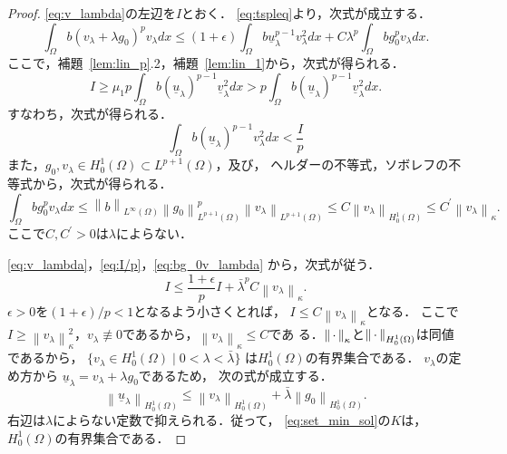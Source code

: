 \begin{proof}
 \eqref{eq:v_lambda}の左辺を$I$とおく．
 \eqref{eq:tspleq}より，次式が成立する．
 \begin{equation}
  \int_\Omega b (v_\lambda + \lambda g_0)^p v_\lambda dx 
   \leq (1 + \epsilon) \int_\Omega b \underline{u}_\lambda ^{p-1}
   v_\lambda^2 dx + C \lambda^p \int_\Omega bg_0^p v_\lambda dx.
   \label{eq:v_lambda_I}
 \end{equation}
 ここで，補題~\ref{lem:lin_p}.2，補題~\ref{lem:lin_1}から，次式が得られる．
 \[
  I \geq \mu_1 p \int_\Omega b (\underline{u}_\lambda)^{p-1}
 \underline{v}_\lambda^2 dx > p \int_\Omega b (\underline{u}_\lambda)^{p-1}
 \underline{v}_\lambda^2 dx.
 \]
 すなわち，次式が得られる．
 \begin{equation}
  \int_\Omega b(\underline{u}_\lambda)^{p-1} v_\lambda^2 dx <
   \frac{I}{p} \label{eq:I/p}
 \end{equation}
 また，$g_0, v_\lambda \in H_0^1(\Omega) \subset L^{p+1}(\Omega)$，及び，
 ヘルダーの不等式，ソボレフの不等式から，次式が得られる．
 \begin{equation}
  \int_\Omega b g_0^p v_\lambda dx \leq 
   \left\| b  \right\|_{L^\infty(\Omega)}
   \left\| g_0 \right\|_{L^{p+1}(\Omega)}^p 
   \left\| v_\lambda \right\|_{L^{p+1}(\Omega)}
   \leq C \left\| v_\lambda \right\|_{H_0^1(\Omega)}
   \leq C^\prime \left\| v_\lambda \right\|_{\kappa}.
   \label{eq:bg_0v_lambda}
 \end{equation}
 ここで$C, C^\prime > 0$は$\lambda$によらない．

 \eqref{eq:v_lambda}，\eqref{eq:I/p}，\eqref{eq:bg_0v_lambda}
 から，次式が従う．
 \[
  I \leq \frac{1 + \epsilon}{p} I + \bar{\lambda}^p C \left\|
 v_\lambda \right\|_{\kappa}.
 \]
 $\epsilon > 0$を$(1+\epsilon)/p < 1$となるよう小さくとれば，
 $I \leq C \left\| v_\lambda \right\|_\kappa$となる．
 ここで$I \geq \left\| v_\lambda \right\|_\kappa^2$，$v_\lambda \not
 \equiv 0$であるから，$\left\| v_\lambda \right\|_{\kappa} \leq C$であ
 る．$\left\|\, \cdot \, \right\|_\kappa$と$\left\|\, \cdot \, \right\|_{H_0^1(\Omega)}$は同値であるから，
 $\{ v_\lambda \in H_0^1(\Omega) \mid 0 < \lambda < \bar{\lambda} \}$
 は$H_0^1(\Omega)$の有界集合である．
 $v_\lambda$の定め方から
 $\underline{u}_\lambda = v_\lambda + \lambda g_0$であるため，
 次の式が成立する．
 \[
  \left\| \underline{u}_\lambda \right\|_{H_0^1(\Omega)} 
 \leq \left\| v_\lambda \right\|_{H_0^1(\Omega)}
 + \bar{\lambda} \left\| g_0 \right\|_{H_0^1(\Omega)}.
 \]
 右辺は$\lambda$によらない定数で抑えられる．従って，
 \eqref{eq:set_min_sol}の$K$は，$H_0^1(\Omega)$の有界集合である．\qedhere
\end{proof}

